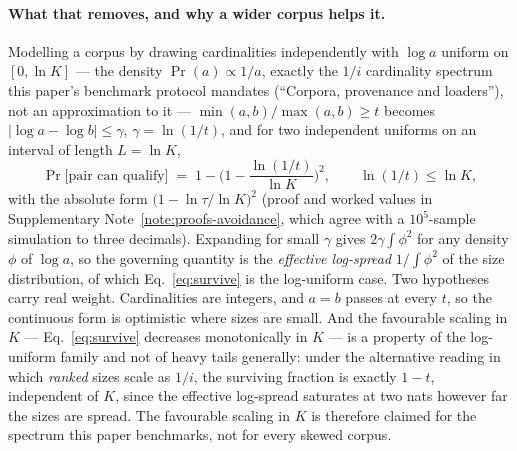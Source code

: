 \paragraph*{What that removes, and why a wider corpus helps it.}
Modelling a corpus by drawing cardinalities independently with $\log a$ uniform on $[0,\ln K]$ --- the
density $\Pr(a)\propto 1/a$, exactly the $1/i$ cardinality spectrum this paper's benchmark protocol
mandates (``Corpora, provenance and loaders''), not an approximation to it ---
$\min(a,b)/\max(a,b)\ge t$ becomes $|\log a - \log b|\le\gamma$, $\gamma=\ln(1/t)$, and for two
independent uniforms on an interval of length $L=\ln K$,
\begin{equation}
\Pr\big[\text{pair can qualify}\big] \;=\; 1-\Big(1-\frac{\ln(1/t)}{\ln K}\Big)^{2},
\qquad \ln(1/t)\le\ln K,
\label{eq:survive}
\end{equation}
with the absolute form $\big(1-\ln\tau/\ln K\big)^{2}$ (proof and worked values in Supplementary Note~\ref{note:proofs-avoidance}, which agree with a $10^{5}$-sample simulation to three decimals). Expanding for small $\gamma$
gives $2\gamma\!\int\!\phi^{2}$ for any density $\phi$ of $\log a$, so the governing quantity is the
\emph{effective log-spread} $1/\!\int\!\phi^{2}$ of the size distribution, of which
Eq.~\eqref{eq:survive} is the log-uniform case. Two hypotheses carry real weight. Cardinalities are
integers, and $a=b$ passes at every $t$, so the continuous form is optimistic where sizes are small.
And the favourable scaling in $K$ --- Eq.~\eqref{eq:survive} decreases monotonically in $K$ --- is a
property of the log-uniform family and not of heavy tails generally: under the alternative reading in
which \emph{ranked} sizes scale as $1/i$, the surviving fraction is exactly $1-t$, independent of $K$,
since the effective log-spread saturates at two nats however far the sizes are spread. The favourable
scaling in $K$ is therefore claimed for the spectrum this paper benchmarks, not for every skewed
corpus.

